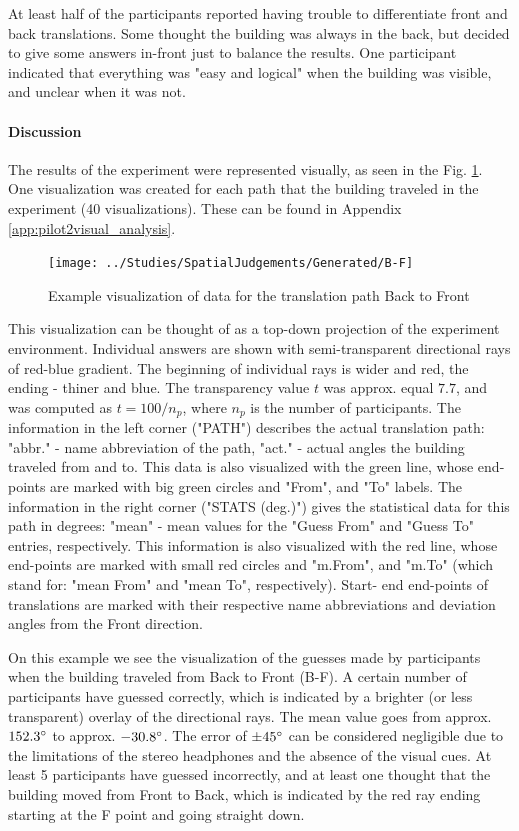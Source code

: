 At least half of the participants reported having trouble to differentiate front and back translations. Some thought the building was always in the back, but decided to give some answers in-front just to balance the results. One participant indicated that everything was "easy and logical" when the building was visible, and unclear when it was not.

\paragraph{Discussion}
The results of the experiment were represented visually, as seen in the Fig. \ref{fig:b-f}. One visualization was created for each path that the building traveled in the experiment (40 visualizations). These can be found in Appendix \ref{app:pilot2visual_analysis}.

\begin{figure}
	\centering
	\texttt{[image: ../Studies/SpatialJudgements/Generated/B-F]}
	\caption{Example visualization of data for the translation path Back to Front}
	\label{fig:b-f}
\end{figure}

This visualization can be thought of as a top-down projection of the experiment environment.
Individual answers are shown with semi-transparent directional rays of red-blue gradient. The beginning of individual rays is wider and red, the ending - thiner and blue. The transparency value $t$ was approx. equal $7.7$, and was computed as $t = 100 / n_{p}$, where $ n_{p} $ is the number of participants.
The information in the left corner ("PATH") describes the actual translation path: "abbr." - name abbreviation of the path, "act." - actual angles the building traveled from and to. This data is also visualized with the green line, whose end-points are marked with big green circles and "From", and "To" labels.
The information in the right corner ("STATS (deg.)") gives the statistical data for this path in degrees: "mean" - mean values for the "Guess From" and "Guess To" entries, respectively. This information is also visualized with the red line, whose end-points are marked with small red circles and "m.From", and "m.To" (which stand for: "mean From" and "mean To", respectively).
Start- end end-points of translations are marked with their respective name abbreviations and deviation angles from the Front direction.

On this example we see the visualization of the guesses made by participants when the building traveled from Back to Front (B-F). A certain number of participants have guessed correctly, which is indicated by a brighter (or less transparent) overlay of the directional rays. The mean value goes from approx. $152.3\degree$ to approx. $- 30.8\degree$. The error of $\pm 45\degree$ can be considered negligible due to the limitations of the stereo headphones and the absence of the visual cues. At least 5 participants have guessed incorrectly, and at least one thought that the building moved from Front to Back, which is indicated by the red ray ending starting at the F point and going straight down.


